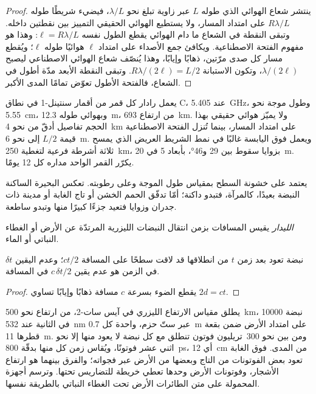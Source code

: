 \begin{proof}
ينتشر شعاع الهوائي الذي طوله $L$ عبر زاوية تبلغ نحو
$\lambda/L$، فيضيء شريطًا طوله $R\lambda/L$ على امتداد المسار، ولا
يستطيع الهوائي الحقيقي التمييز بين نقطتين داخله. وتبقى النقطة في
الشعاع ما دام الهوائي يقطع الطول نفسه $\ell = R\lambda/L$:
وهذا هو مفهوم الفتحة الاصطناعية. ويكافئ جمع الأصداء على امتداد $\ell$
هوائيًا طوله $\ell$؛ ويُقطع مسار كل صدى
مرّتين، ذهابًا وإيابًا، وهذا يُنصّف شعاع الهوائي الاصطناعي
ليصبح $\lambda/(2\ell)$، وتكون الاستبانة $R\lambda/(2\ell) =
L/2$. وتبقى النقطة الأبعد مدّة أطول في الشعاع، فالفتحة الأطول
تعوّض تمامًا المدى الأكبر.
\end{proof}

يعمل رادار كل قمر من أقمار سنتينل-1 في نطاق C، عند
\qty{5.405}{GHz}، وطول موجة نحو \qty{5.55}{cm}، وبهوائي
طوله \qty{12.3}{m}، من ارتفاع \qty{693}{km}. ولا يميّز هوائي حقيقي بهذا الحجم
تفاصيل أدقّ من نحو \qty{4}{km} على امتداد المسار، بينما تُنزل الفتحة الاصطناعية
قيمة $L/2$ إلى نحو \qty{6}{m}. ويعمل فوق اليابسة غالبًا في
نمط الشريط العريض الذي يمسح ثلاثة أشرطة فرعية لتغطية \qty{250}{km}، بزوايا سقوط
بين 29 و\ang{46}، بأبعاد 5 في \qty{20}{m}.
يكرّر القمر الواحد مداره كل 12 يومًا.

يعتمد  على خشونة السطح بمقياس
طول الموجة وعلى رطوبته. تعكس البحيرة الساكنة النبضة بعيدًا، كالمرآة،
فتبدو داكنة؛ أمّا تدفّق الحمم الخشن أو تاج الغابة أو مدينة ذات جدران
وزوايا فتعيد جزءًا كبيرًا منها وتبدو ساطعة.

\begin{definition}[الليدار]\label{def:b3:remote-sensing-gis:lidar}
\emph{الليدار} يقيس المسافات بزمن انتقال النبضات الليزرية
المرتدّة عن الأرض أو الغطاء النباتي أو الماء.
\end{definition}

\begin{proposition}\label{prop:b3:remote-sensing-gis:tof}
نبضة تعود بعد زمن $t$ من انطلاقها قد لاقت سطحًا على المسافة
$ct/2$؛ وعدم اليقين $\delta t$ في الزمن هو عدم يقين
$c\,\delta t/2$ في المسافة.
\end{proposition}

\begin{proof}
يقطع الضوء بسرعة $c$ مسافة ذهابًا وإيابًا تساوي $2d = ct$.
\end{proof}

يطلق مقياس الارتفاع الليزري في آيس سات-2، من ارتفاع نحو \qty{500}{km}،
\num{10000} نبضة في الثانية عند \qty{532}{nm} عبر ستّ حزم، واحدة كل
\qty{0.7}{m} على امتداد الأرض ضمن بقعة قطرها \qty{11}{m}. ومن بين
نحو 300~تريليون فوتون تنطلق مع كل نبضة لا يعود منها إلا نحو اثني عشر
فوتونًا، ويُقاس زمن كل منها بدقّة \qty{800}{ps}، أي \qty{12}{cm} من المدى.
فوق الغابة تعود بعض الفوتونات من التاج وبعضها من الأرض
عبر فجواته؛ والفرق بينهما هو ارتفاع الأشجار، وفوتونات الأرض وحدها
تعطي خريطة للتضاريس تحتها. وترسم أجهزة  المحمولة على
متن الطائرات الأرض تحت الغطاء النباتي بالطريقة نفسها.

